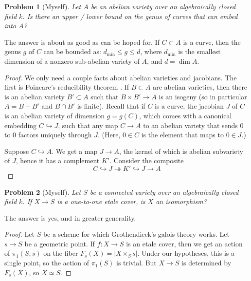 \documentclass{article}
\newtheorem{problem}{Problem}
\begin{document}
\begin{problem}[Myself]
Let $A$ be an abelian variety over an algebraically closed field $k$. Is there 
an upper / lower bound on the genus of curves that can embed into $A$?
\end{problem}
The answer is about as good as can be hoped for. If $C\subset A$ is a curve, 
then the genus $g$ of $C$ can be bounded as: 
$d_\text{min}\leqslant g\leqslant d$, where $d_\text{min}$ is the smallest 
dimension of a nonzero sub-abelian variety of $A$, and $d=\dim A$.
\begin{proof}
We only need a couple facts about abelian varieties and jacobians. The first 
is Poincare's reducibility theorem \cite[19.1]{Mum}. If $B\subset A$ are 
abelian varieties, then there is an abelian variety $B'\subset A$ such that 
$B\times B'\to A$ is an isogeny (so in particular $A=B+B'$ and $B\cap B'$ is 
finite). Recall that if $C$ is a curve, the jacobian $J$ of $C$ is an abelian 
variety of dimension $g=g(C)$, which comes with a canonical embedding 
$C\hookrightarrow J$, such that any map $C\to A$ to an abelian variety that 
sends $0$ to $0$ factors uniquely through $J$. (Here, $0\in C$ is the element 
that maps to $0\in J$.) 

Suppose $C\hookrightarrow A$. We get a map $J\to A$, the kernel of which is 
abelian subvariety of $J$, hence it has a complement $K'$. Consider the 
composite 
\[
  C \hookrightarrow J \twoheadrightarrow K' \hookrightarrow J \to A
\]
\end{proof}





\begin{problem}[Myself]
Let $S$ be a connected variety over an algebraically closed field $k$. If 
$X\to S$ is a one-to-one etale cover, is $X$ an isomorphism?
\end{problem}
The answer is yes, and in greater generality.
\begin{proof}
Let $S$ be a scheme for which Grothendieck's galois theory works. Let 
$s\to S$ be a geometric point. If $f:X\to S$ is an etale cover, then we get 
an action of $\pi_1(S,s)$ on the fiber $F_s(X)=|X\times_S s|$. Under our 
hypotheses, this is a single point, so the action of $\pi_1(S)$ is trivial. 
But $X\to S$ is determined by $F_s(X)$, so $X\simeq S$. 
\end{proof}
\end{document}
